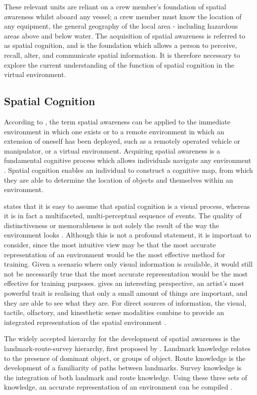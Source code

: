 \documentclass[ %
                    author={Elis Jones},
                supervisor={Dr. Kirsten Cater},
                    degree={BSc},
                     title={The Effect of Presentation Medium on Spatial Cognition},
                  subtitle={in the Virtual Environment},
                      year={2018} ]{dissertation}
\begin{document}
These relevant units are reliant on a crew member's foundation of spatial awareness whilst aboard any vessel; a crew member must know the location of any equipment, the general geography of the local area - including hazardous areas above and below water. The acquisition of spatial awareness is referred to as spatial cognition, and is the foundation which allows a person to perceive, recall, alter, and communicate spatial information. It is therefore necessary to explore the current understanding of the function of spatial cognition in the virtual environment.

\subsection{Spatial Cognition}
According to \cite{stone}, the term spatial awareness can be applied to the immediate environment in which one exists or to a remote environment in which an extension of oneself has been deployed, such as a remotely operated vehicle or manipulator, or a virtual environment. Acquiring spatial awareness is a fundamental cognitive process which allows individuals navigate any environment \citep{Michael2008}. Spatial cognition enables an individual to construct a cognitive map, from which they are able to determine the location of objects and themselves within an environment. \citep{downs}

 \cite{osberg} states that it is easy to assume that spatial cognition is a visual process, whereas it is in fact a multifaceted, multi-perceptual sequence of events.  The quality of distinctiveness or memorableness is not solely the result of the way the environment looks \citep{downs}. Although this is not a profound statement, it is important to consider, since the most intuitive view may be that the most accurate representation of an environment would be the most effective method for training. Given a scenario where only visual information is available, it would still not be necessarily true that the most accurate representation would be the most effective for training purposes. \cite{gleick} gives an interesting perspective, an artist's most powerful trait is realising that only a small amount of things are important, and they are able to see what they are. For direct sources of information, the visual, tactile, olfactory, and kinesthetic sense modalities combine to provide an integrated representation of the spatial environment \citep{downs}.

The widely accepted hierarchy for the development of spatial awareness is the landmark-route-survey hierarchy, first proposed by \cite{siegel}.  Landmark knowledge relates to the presence of dominant object, or groups of object. Route knowledge is the development of a familiarity of paths between landmarks. Survey knowledge is the integration of both landmark and route knowledge. Using these three sets of knowledge, an accurate representation of an environment can be compiled \citep{stone}.
\end{document}
